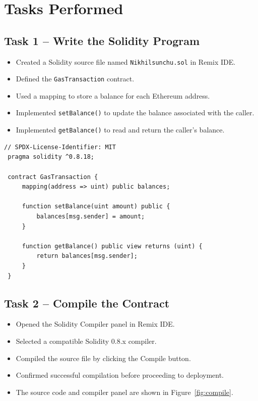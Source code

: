 \documentclass[12pt,a4paper]{article}
\begin{document}
\section{Tasks Performed}
\subsection{Task 1 -- Write the Solidity Program}
\begin{itemize}
    \item Created a Solidity source file named \texttt{Nikhilsunchu.sol} in Remix IDE.
    \item Defined the \texttt{GasTransaction} contract.
    \item Used a mapping to store a balance for each Ethereum address.
    \item Implemented \texttt{setBalance()} to update the balance associated with the caller.
    \item Implemented \texttt{getBalance()} to read and return the caller's balance.
\end{itemize}

{\renewcommand{\baselinestretch}{0.9}\selectfont
\begin{lstlisting}[style=soliditystyle]
 // SPDX-License-Identifier: MIT
 pragma solidity ^0.8.18;

 contract GasTransaction {
     mapping(address => uint) public balances;

     function setBalance(uint amount) public {
         balances[msg.sender] = amount;
     }

     function getBalance() public view returns (uint) {
         return balances[msg.sender];
     }
 }
\end{lstlisting}
}

\subsection{Task 2 -- Compile the Contract}
\begin{itemize}
    \item Opened the Solidity Compiler panel in Remix IDE.
    \item Selected a compatible Solidity 0.8.x compiler.
    \item Compiled the source file by clicking the Compile button.
    \item Confirmed successful compilation before proceeding to deployment.
    \item The source code and compiler panel are shown in Figure~\ref{fig:compile}.
\end{itemize}
\end{document}
